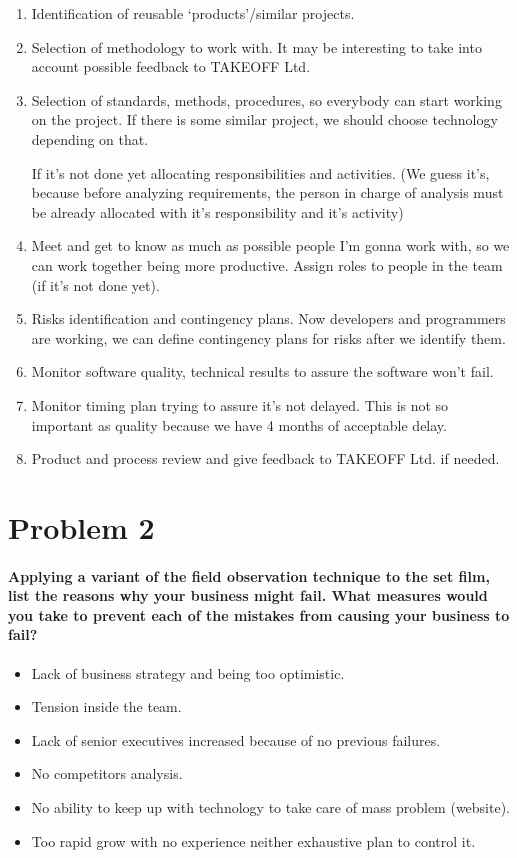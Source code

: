 \documentclass{article}
\begin{document}
\begin{enumerate}
\item Identification of reusable ‘products’/similar projects.
\item Selection of methodology to work with. It may be interesting to take into account possible feedback to TAKEOFF Ltd.
\item Selection of standards, methods, procedures, so everybody can start working on the project. If there is some similar project, we should choose technology depending on that.

If it's not done yet allocating responsibilities and activities.
(We guess it's, because before analyzing requirements, the person in charge of analysis must be already allocated with it's responsibility and it's activity)\item Meet and get to know as much as possible people I'm gonna work with, so we can work together being more productive.
 Assign roles to people in the team (if it's not done yet).
\item Risks identification and contingency plans. Now developers and programmers are working, we can define contingency plans for risks after we identify them.
\item Monitor software quality, technical results to assure the software won't fail.
\item Monitor timing plan trying to assure it's not delayed. This is not so important as quality because we have 4 months of acceptable delay.
\item Product and process review and give feedback to TAKEOFF Ltd. if needed.

\end{enumerate}


\section{Problem 2}

\paragraph{Applying a variant of the field observation technique to the set film, list the reasons why your business might fail. What measures would you take to prevent each of the mistakes from causing your business to fail?}



\begin{itemize}
	\item Lack of business strategy and being too optimistic.
	\item Tension inside the team.
	\item Lack of senior executives increased because of no previous failures.
	\item No competitors analysis.
	\item No ability to keep up with technology to take care of mass problem (website).
	\item Too rapid grow with no experience neither exhaustive plan to control it.

\end{itemize}
\end{document}
